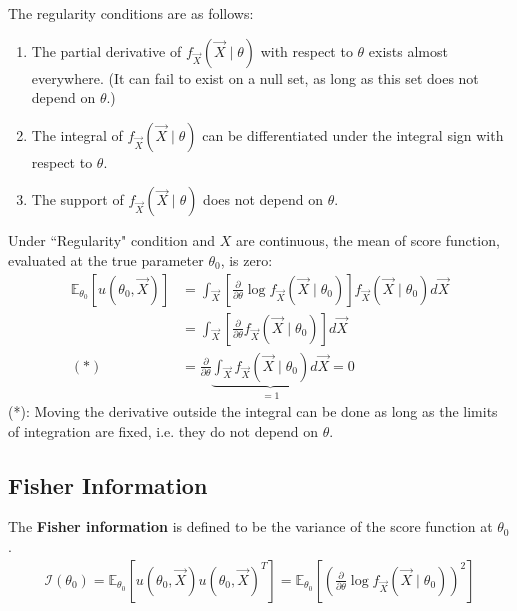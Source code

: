 \documentclass[11pt]{elegantbook}
\begin{document}
\begin{definition}
    \normalfont
    The regularity conditions are as follows:
    \begin{enumerate}
        \item The partial derivative of $f_{\vec{X}}(\vec{X}\mid\theta)$ with respect to $\theta$ exists almost everywhere. (It can fail to exist on a null set, as long as this set does not depend on $\theta$.)
        \item The integral of $f_{\vec{X}}(\vec{X}\mid\theta)$ can be differentiated under the integral sign with respect to $\theta$.
        \item The support of $f_{\vec{X}}(\vec{X}\mid\theta)$ does not depend on $\theta$.
    \end{enumerate}
\end{definition}

\begin{lemma}
    \normalfont
    Under ``Regularity" condition and $X$ are continuous, the mean of score function, evaluated at the true parameter $\theta_0$, is zero:
    \begin{equation}
        \begin{aligned}
            \mathbb{E}_{\theta_0}\left[u(\theta_0,\vec{X})\right]&=\int_{\vec{X}} \left[\frac{\partial}{\partial \theta}\log f_{\vec{X}}(\vec{X}\mid\theta_0)\right]f_{\vec{X}}(\vec{X}\mid\theta_0) d\vec{X}\\
            &=\int_{\vec{X}}  \left[\frac{\partial}{\partial \theta}f_{\vec{X}}(\vec{X}\mid\theta_0)\right]d\vec{X}\\
            (*)\quad &=\frac{\partial}{\partial \theta}\underbrace{\int_{\vec{X}}  f_{\vec{X}}(\vec{X}\mid\theta_0)d\vec{X}}_{=1}=0
        \end{aligned}
        \nonumber
    \end{equation}
    (*): Moving the derivative outside the integral can be done as long as the limits of integration are fixed, i.e. they do not depend on $\theta$.
\end{lemma}


\subsection{Fisher Information}
\begin{definition}
    \normalfont
    The \textbf{Fisher information} is defined to be the variance of the score function at $\theta_0$.
    \begin{equation}
        \begin{aligned}
            \mathcal{I}(\theta_0)=\mathbb{E}_{\theta_0}[u(\theta_0,\vec{X})u(\theta_0,\vec{X})^T]=\mathbb{E}_{\theta_0}\left[\left(\frac{\partial}{\partial \theta}\log f_{\vec{X}}(\vec{X}\mid\theta_0)\right)^2\right]
        \end{aligned}
        \nonumber
    \end{equation}
\end{definition}
\end{document}
